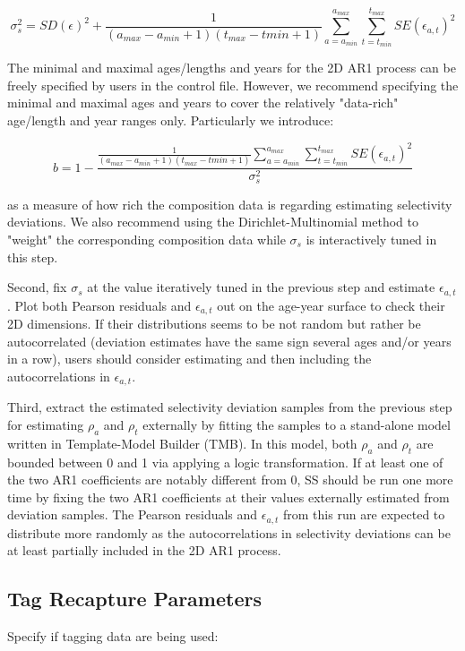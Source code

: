 	\begin{equation}
		\sigma_s^2=SD(\epsilon)^2+\frac{1}{(a_{max}-a_{min}+1)(t_{max}-t{min}+1)}\sum_{a=a_{min}}^{a_{max}}\sum_{t=t_{min}}^{t_{max}}SE(\epsilon_{a,t})^2
	\end{equation}
	
The minimal and maximal ages/lengths and years for the 2D AR1 process can be freely specified by users in the control file. However, we recommend specifying the minimal and maximal ages and years to cover the relatively "data-rich" age/length and year ranges only. Particularly we introduce: 

	\begin{equation}
		b=1-\frac{\frac{1}{(a_{max}-a_{min}+1)(t_{max}-t{min}+1)}\sum_{a=a_{min}}^{a_{max}}\sum_{t=t_{min}}^{t_{max}}SE(\epsilon_{a,t})^2}{\sigma_s^2}
	\end{equation}
	
as a measure of how rich the composition data is regarding estimating selectivity deviations. We also recommend using the Dirichlet-Multinomial method to "weight" the corresponding composition data while $\sigma_s$ is interactively tuned in this step.
	
Second, fix $\sigma_s$ at the value iteratively tuned in the previous step and estimate $\epsilon_{a,t}$. Plot both Pearson residuals and $\epsilon_{a,t}$ out on the age-year surface to check their 2D dimensions. If their distributions seems to be not random but rather be autocorrelated (deviation estimates have the same sign several ages and/or years in a row), users should consider estimating and then including the autocorrelations in $\epsilon_{a,t}$.

Third, extract the estimated selectivity deviation samples from the previous step for estimating $\rho_a$ and $\rho_t$ externally by fitting the samples to a stand-alone model written in Template-Model Builder (TMB). In this model, both $\rho_a$ and $\rho_t$ are bounded between 0 and 1 via applying a logic transformation. If at least one of the two AR1 coefficients are notably different from 0, SS should be run one more time by fixing the two AR1 coefficients at their values externally estimated from deviation samples. The Pearson residuals and $\epsilon_{a,t}$ from this run are expected to distribute more randomly as the  autocorrelations in selectivity deviations can be at least partially included in the 2D AR1 process.


\subsection{Tag Recapture Parameters}
Specify if tagging data are being used:



